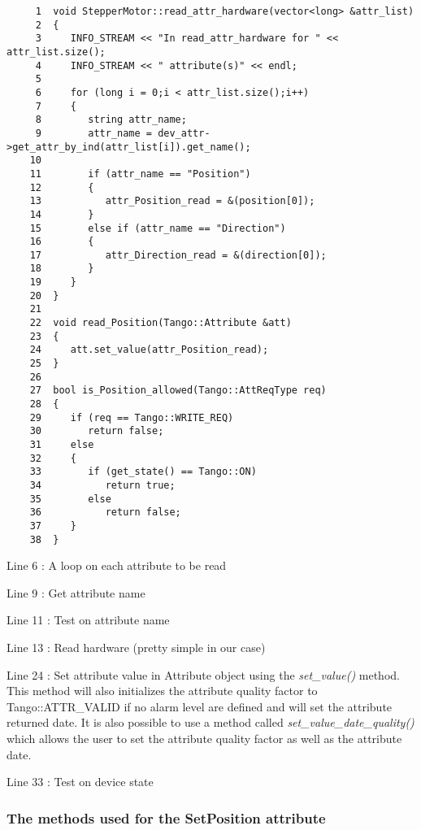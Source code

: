 \begin{verbatim}
     1  void StepperMotor::read_attr_hardware(vector<long> &attr_list)
     2  {
     3     INFO_STREAM << "In read_attr_hardware for " << attr_list.size();
     4     INFO_STREAM << " attribute(s)" << endl;
     5  
     6     for (long i = 0;i < attr_list.size();i++)
     7     {
     8        string attr_name;
     9        attr_name = dev_attr->get_attr_by_ind(attr_list[i]).get_name();
    10  
    11        if (attr_name == "Position")
    12        {
    13           attr_Position_read = &(position[0]);
    14        }
    15        else if (attr_name == "Direction")
    16        {
    17           attr_Direction_read = &(direction[0]);
    18        }
    19     }
    20  }
    21  
    22  void read_Position(Tango::Attribute &att)
    23  {
    24     att.set_value(attr_Position_read);
    25  }
    26  
    27  bool is_Position_allowed(Tango::AttReqType req)
    28  {
    29     if (req == Tango::WRITE_REQ)
    30        return false;
    31     else
    32     {
    33        if (get_state() == Tango::ON)
    34           return true;
    35        else
    36           return false;
    37     }
    38  }
\end{verbatim}


Line 6 : A loop on each attribute to be read

Line 9 : Get attribute name

Line 11 : Test on attribute name

Line 13 : Read hardware (pretty simple in our case)

Line 24 : Set attribute value in Attribute object using the \emph{set\_value()}
method. This method will also initializes the attribute quality factor
to Tango::ATTR\_VALID if no alarm level are defined
and will set the attribute returned date. It is also possible to use
a method called \emph{set\_value\_date\_quality()}
which allows the user to set the attribute quality factor as well
as the attribute date.

Line 33 : Test on device state


\subsubsection{The methods used for the SetPosition attribute}

